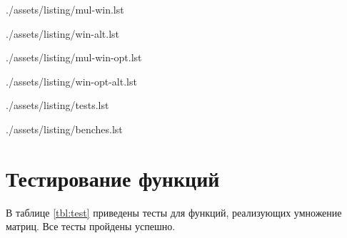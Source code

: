 \clearpage
\begin{lstinputlisting}[
	caption={Умножение матриц алгоритмом Винограда},
	label={lst:mul-win},
	style={golang}
]{./assets/listing/mul-win.lst}
\end{lstinputlisting}

\begin{lstinputlisting}[
	caption={Вспомогательные функии для алгоритма Винограда},
	label={lst:win-alt},
	style={golang}
]{./assets/listing/win-alt.lst}
\end{lstinputlisting}

\clearpage
\begin{lstinputlisting}[
	caption={Умножение матриц оптимизированным алгоритмом Винограда},
	label={lst:mul-win-opt},
	style={golang}
]{./assets/listing/mul-win-opt.lst}
\end{lstinputlisting}

\begin{lstinputlisting}[
	caption={Вспомогательные функии для оптимизированного алгоритма},
	label={lst:win-opt-alt},
	style={golang}
]{./assets/listing/win-opt-alt.lst}
\end{lstinputlisting}

\clearpage
\begin{lstinputlisting}[
	caption={Пример реализации тестов},
	label={lst:tests},
	style={golang}
]{./assets/listing/tests.lst}
\end{lstinputlisting}

\clearpage
\begin{lstinputlisting}[
	caption={Пример реализации бенчмарка},
	label={lst:benches},
	style={golang}
]{./assets/listing/benches.lst}
\end{lstinputlisting}

\clearpage
\section{Тестирование функций}

В таблице \ref{tbl:test} приведены тесты для функций, реализующих умножение матриц.
Все тесты пройдены успешно.

